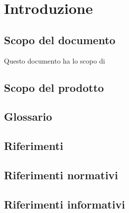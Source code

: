 \section{Introduzione}
\subsection{Scopo del documento}
Questo documento ha lo scopo di

\subsection{Scopo del prodotto}

\subsection{Glossario}

\subsection{Riferimenti}

\subsection{Riferimenti normativi}

\subsection{Riferimenti informativi}
	